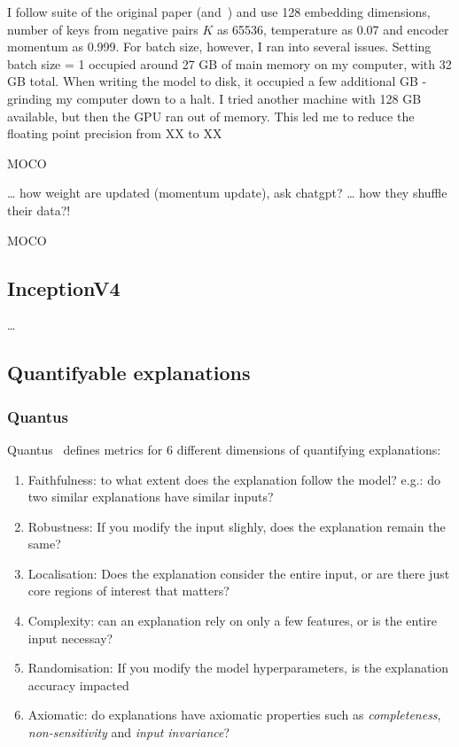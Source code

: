 \documentclass[10pt,twocolumn,letterpaper]{article}
\begin{document}
I follow suite of the original paper (and~\cite{moco}) and use 128 embedding dimensions, number of keys from negative pairs $K$ as 65536, temperature as 0.07 and encoder momentum as 0.999. For batch size, however, I ran into several issues. Setting batch size = 1 occupied around 27 GB of main memory on my computer, with 32 GB total. When writing the model to disk, it occupied a few additional GB - grinding my computer down to a halt. I tried another machine with 128 GB available, but then the \gls{GPU} ran out of memory. This led me to reduce the floating point precision from XX to XX %

\gls{MOCO} 

\dots{} how weight are updated (momentum update), ask chatgpt?
\dots{} how they shuffle their data?! 

\gls{MOCO}

\subsection{InceptionV4}
\dots{}

\subsection{Quantifyable explanations}\label{sec:quantifiable}
\subsubsection{Quantus}

Quantus~\cite{hedstrom2023quantus} defines metrics for 6 different dimensions of quantifying explanations:
\begin{enumerate}
  \item Faithfulness: to what extent does the explanation follow the model? e.g.: do two similar explanations have similar inputs?
  \item Robustness: If you modify the input slighly, does the explanation remain the same?
  \item Localisation: Does the explanation consider the entire input, or are there just core regions of interest that matters?
  \item Complexity: can an explanation rely on only a few features, or is the entire input necessay?
  \item Randomisation: If you modify the model hyperparameters, is the explanation accuracy impacted
  \item Axiomatic: do explanations have axiomatic properties such as \textit{completeness}, \textit{non-sensitivity} and \textit{input invariance}?
\end{enumerate}
\end{document}
